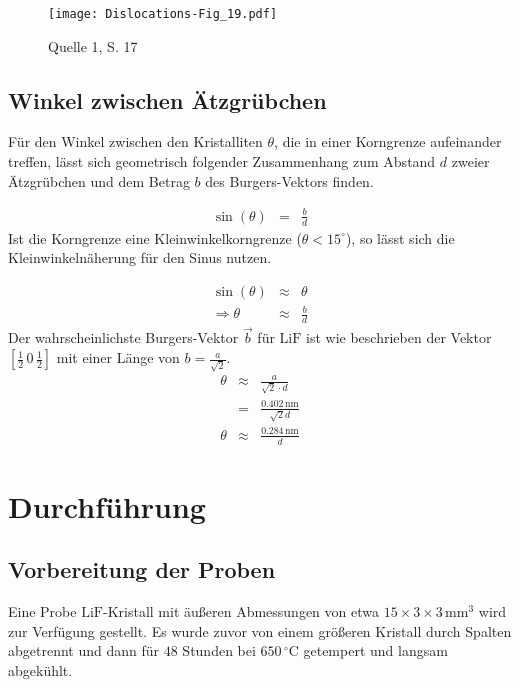 \documentclass[12pt,a4paper]{scrartcl}
\numberwithin{equation}{section} %
\renewcommand{\[}{} %
\renewcommand{\]}{\noindent} %
\begin{document}
\begin{figure}
\centering
\texttt{[image: Dislocations-Fig\_19.pdf]}
\caption{Quelle 1, S. 17}
\end{figure}

\hypertarget{winkel-zwischen-uxe4tzgruxfcbchen}{%
\subsection{Winkel zwischen
Ätzgrübchen}\label{winkel-zwischen-uxe4tzgruxfcbchen}}

Für den Winkel zwischen den Kristalliten \(\theta\), die in einer
Korngrenze aufeinander treffen, lässt sich geometrisch folgender
Zusammenhang zum Abstand \(d\) zweier Ätzgrübchen und dem Betrag \(b\)
des Burgers-Vektors finden.

\[
\begin{eqnarray}
    \sin(\theta) &=& \frac{b}{d}
\end{eqnarray}
\] Ist die Korngrenze eine Kleinwinkelkorngrenze
(\(\theta < 15^\circ\)), so lässt sich die Kleinwinkelnäherung für den
Sinus nutzen.

\[
\begin{eqnarray}
    \sin(\theta) &\approx& \theta \\
    \Rightarrow \theta &\approx& \frac{b}{d}
\end{eqnarray}
\] Der wahrscheinlichste Burgers-Vektor \(\vec{b}\) für \(\mathrm{LiF}\)
ist wie beschrieben der Vektor \([\frac{1}{2}\,0\,\frac{1}{2}]\) mit
einer Länge von \(b = \frac{a}{\sqrt{2}}\). \[
\begin{eqnarray}
    \theta &\approx& \frac{a}{\sqrt{2} \cdot d} \\
        &=& \frac{0.402\,\mathrm{nm}}{\sqrt{2} d}\\
    \theta &\approx& \frac{0.284\,\mathrm{nm}}{d} \label{theta}
\end{eqnarray}
\]

\hypertarget{durchfuxfchrung}{%
\section{Durchführung}\label{durchfuxfchrung}}

\hypertarget{vorbereitung-der-proben}{%
\subsection{Vorbereitung der Proben}\label{vorbereitung-der-proben}}

Eine Probe \(\mathrm{LiF}\)-Kristall mit äußeren Abmessungen von etwa
\(15 \times 3 \times 3 \,\mathrm{mm^3}\) wird zur Verfügung gestellt. Es
wurde zuvor von einem größeren Kristall durch Spalten abgetrennt und
dann für \(48\) Stunden bei \(650\,^\circ\mathrm C\) getempert und
langsam abgekühlt.
\end{document}
